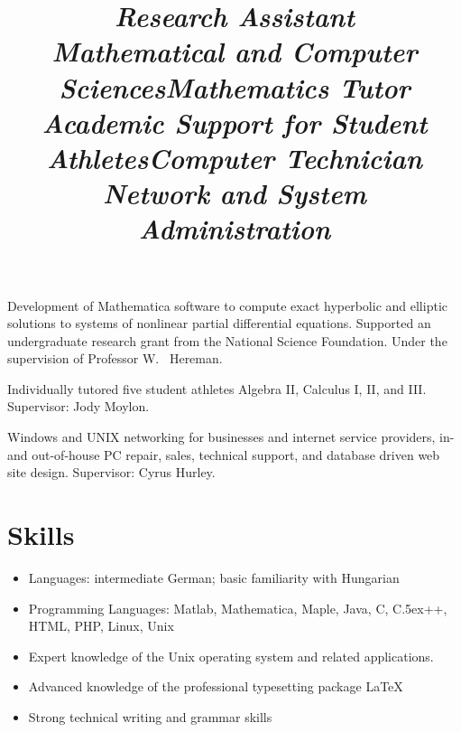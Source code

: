 \documentclass[margin,line,11pt,draft]{res}
\def\Cplusplus{{\rm C\raise.5ex\hbox{\small ++}}}
\begin{document}
\begin{resume}
\title{\em Research Assistant \\ Mathematical and Computer Sciences}
\location{}
\begin{position}
Development of Mathematica software to compute exact hyperbolic and
elliptic solutions to systems of nonlinear partial differential
equations. Supported an undergraduate research grant from the National
Science Foundation.  Under the supervision of Professor W. \ Hereman.
\end{position}

\title{\em Mathematics Tutor \\ Academic Support for Student Athletes}
\location{}
\begin{position}
Individually tutored five student athletes Algebra II, Calculus I, II,
and III. Supervisor: Jody Moylon.
\end{position}

\title{\em Computer Technician \\ Network and System Administration}
\location{}
\begin{position}
Windows and UNIX networking for businesses and internet service providers,
in- and out-of-house PC repair, sales, technical support, and database driven
web site design. Supervisor: Cyrus Hurley.
\end{position}


\section{\sc Skills}
\begin{itemize}
\item Languages: intermediate German; basic familiarity with Hungarian
\item Programming Languages: Matlab, Mathematica, Maple, Java, C,
  \Cplusplus, HTML, PHP, Linux, Unix
\item Expert knowledge of the Unix operating system and related
  applications.
\item Advanced knowledge of the professional typesetting package \LaTeX
\item Strong technical writing and grammar skills
\end{itemize}


\end{resume}
\end{document}

